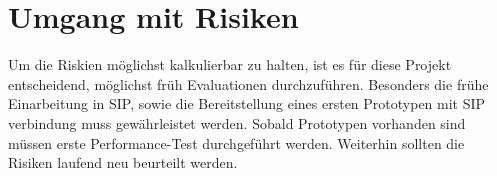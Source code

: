 \section{Umgang mit Risiken}
Um die Riskien möglichst kalkulierbar zu halten, ist es für diese Projekt entscheidend, möglichst früh
Evaluationen durchzuführen. Besonders die frühe Einarbeitung in SIP, sowie die Bereitstellung eines ersten
Prototypen mit SIP verbindung muss gewährleistet werden. Sobald Prototypen vorhanden sind müssen erste
Performance-Test durchgeführt werden. Weiterhin sollten die Risiken laufend neu beurteilt werden.
